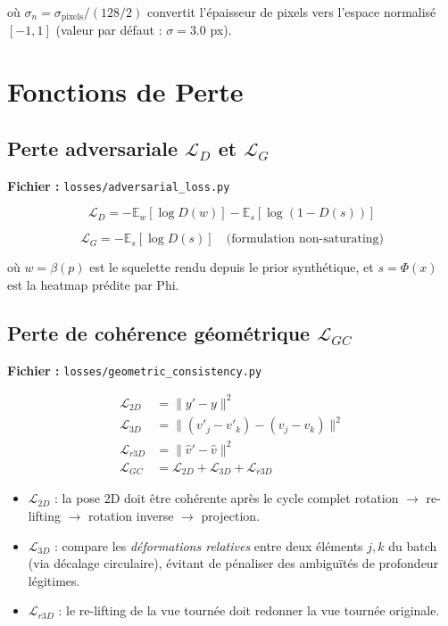 \documentclass[12pt,a4paper]{article}
\begin{document}
où $\sigma_n = \sigma_{\text{pixels}} / (128/2)$ convertit l'épaisseur de pixels
vers l'espace normalisé $[-1,1]$ (valeur par défaut : $\sigma = 3.0$ px).

\section{Fonctions de Perte}

\subsection{Perte adversariale $\mathcal{L}_D$ et $\mathcal{L}_G$}

\textbf{Fichier :} \texttt{losses/adversarial\_loss.py}

\begin{equation}
  \mathcal{L}_D = -\mathbb{E}_w[\log D(w)] - \mathbb{E}_s[\log(1 - D(s))]
\end{equation}

\begin{equation}
  \mathcal{L}_G = -\mathbb{E}_s[\log D(s)] \quad \text{(formulation non-saturating)}
\end{equation}

où $w = \beta(p)$ est le squelette rendu depuis le prior synthétique,
et $s = \Phi(x)$ est la heatmap prédite par Phi.

\subsection{Perte de cohérence géométrique $\mathcal{L}_{GC}$}

\textbf{Fichier :} \texttt{losses/geometric\_consistency.py}

\begin{align}
  \mathcal{L}_{2D} &= \|y' - y\|^2 \label{eq:l2d} \\
  \mathcal{L}_{3D} &= \|(v'_j - v'_k) - (v_j - v_k)\|^2 \label{eq:l3d} \\
  \mathcal{L}_{r3D} &= \|\hat{v}' - \hat{v}\|^2 \label{eq:lr3d} \\
  \mathcal{L}_{GC} &= \mathcal{L}_{2D} + \mathcal{L}_{3D} + \mathcal{L}_{r3D} \label{eq:lgc}
\end{align}

\begin{itemize}
  \item $\mathcal{L}_{2D}$ : la pose 2D doit être cohérente après le cycle complet
        rotation $\to$ re-lifting $\to$ rotation inverse $\to$ projection.
  \item $\mathcal{L}_{3D}$ : compare les \emph{déformations relatives} entre deux
        éléments $j,k$ du batch (via décalage circulaire), évitant de pénaliser des
        ambiguïtés de profondeur légitimes.
  \item $\mathcal{L}_{r3D}$ : le re-lifting de la vue tournée doit redonner
        la vue tournée originale.
\end{itemize}
\end{document}
